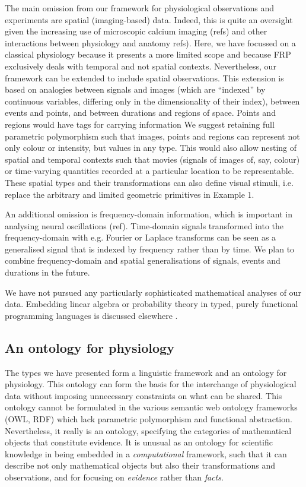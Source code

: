 The main omission from our framework for physiological observations
and experiments are spatial (imaging-based) data. Indeed, this is
quite an oversight given the increasing use of microscopic calcium
imaging (refs) and other interactions between physiology and anatomy
refs). Here, we have focussed on a classical physiology because it
presents a more limited scope and because FRP exclusively deals with
temporal and not spatial contexts. Nevertheless, our framework can be
extended to include spatial observations. This extension is based on
analogies between signals and images (which are ``indexed'' by
continuous variables, differing only in the dimensionality of their
index), between events and points, and between durations and regions
of space. Points and regions would have tags for carrying information
We suggest retaining full parametric polymorphism such that images,
points and regions can represent not only colour or intensity, but
values in any type. This would also allow nesting of spatial and
temporal contexts such that movies (signals of images of, say, colour)
or time-varying quantities recorded at a particular location
\citep[for instance spot calcium measurements;][]{DiGregorio1999} to
be representable. These spatial types and their transformations can
also define visual stimuli, i.e. replace the arbitrary and limited
geometric primitives in Example 1.

An additional omission is frequency-domain information, which is
important in analysing neural oscillations (ref). Time-domain signals
transformed into the frequency-domain with e.g. Fourier or Laplace
transforms can be seen as a generalised signal that is indexed by
frequency rather than by time. We plan to combine frequency-domain and
spatial generalisations of signals, events and durations in the future.

We have not pursued any particularly sophisticated mathematical
analyses of our data. Embedding linear algebra or probability theory
in typed, purely functional programming languages is discussed
elsewhere \citep{Eaton2006, Park2005}.

\subsection*{An ontology for physiology}

The types we have presented form a linguistic framework and an
ontology for physiology. This ontology can form the basis for the
interchange of physiological data without imposing unnecessary
constraints on what can be shared. This ontology cannot be formulated
in the various semantic web ontology frameworks (OWL, RDF) which lack
parametric polymorphism and functional abstraction. Nevertheless, it
really is an ontology, specifying the categories of mathematical
objects that constitute evidence. It is unusual as an ontology for
scientific knowledge in being embedded in a \emph{computational}
framework, such that it can describe not only mathematical objects but
also their transformations and observations, and for focusing on
\emph{evidence} rather than \emph{facts}.

